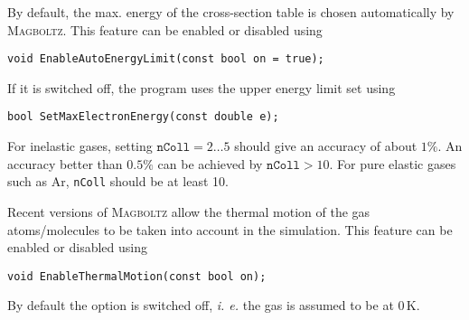 By default, the max. energy of the cross-section table  
is chosen automatically by \textsc{Magboltz}. This feature can be 
enabled or disabled using
\begin{lstlisting}
void EnableAutoEnergyLimit(const bool on = true);
\end{lstlisting} 
If it is switched off, the program uses the upper energy limit set using 
\begin{lstlisting}
bool SetMaxElectronEnergy(const double e);
\end{lstlisting}

For inelastic gases, setting \(\texttt{nColl} = 2 \dots 5\)
should give an accuracy of about \(1\%\). 
An accuracy better than \(0.5\%\) can be achieved by 
\(\texttt{nColl} > 10\). 
For pure elastic gases such as Ar, \texttt{nColl} should 
be at least 10.  

Recent versions of \textsc{Magboltz} allow the thermal motion of the gas 
atoms/molecules to be taken into account in the simulation. 
This feature can be enabled or disabled using
\begin{lstlisting}
void EnableThermalMotion(const bool on);
\end{lstlisting} 
By default the option is switched off, \textit{i. e.} the gas 
is assumed to be at 0\,K. 

